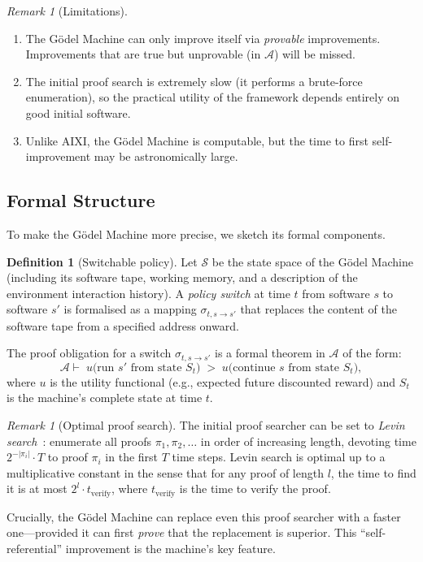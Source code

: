 \documentclass[11pt,a4paper]{article}
\theoremstyle{definition}
\newtheorem{definition}[theorem]{Definition}
\theoremstyle{remark}
\newtheorem{remark}[theorem]{Remark}
\begin{document}
\begin{remark}[Limitations]
\begin{enumerate}[nosep]
\item The G\"odel Machine can only improve itself via \emph{provable}
      improvements.  Improvements that are true but unprovable
      (in $\mathcal{A}$) will be missed.
\item The initial proof search is extremely slow (it performs a brute-force
      enumeration), so the practical utility of the framework depends
      entirely on good initial software.
\item Unlike AIXI, the G\"odel Machine is computable, but the time
      to first self-improvement may be astronomically large.
\end{enumerate}
\end{remark}

\subsection{Formal Structure}

To make the G\"odel Machine more precise, we sketch its formal components.

\begin{definition}[Switchable policy]
Let $\mathcal{S}$ be the state space of the G\"odel Machine (including its
software tape, working memory, and a description of the environment
interaction history).  A \emph{policy switch} at time $t$ from software
$s$ to software $s'$ is formalised as a mapping $\sigma_{t,s\to s'}$ that
replaces the content of the software tape from a specified address onward.
\end{definition}

The proof obligation for a switch $\sigma_{t,s\to s'}$ is a formal theorem
in $\mathcal{A}$ of the form:
\[
  \mathcal{A}\vdash\;
  u\bigl(\text{run } s' \text{ from state } S_t\bigr)
  \;>\;
  u\bigl(\text{continue } s \text{ from state } S_t\bigr),
\]
where $u$ is the utility functional (e.g., expected future discounted reward)
and $S_t$ is the machine's complete state at time $t$.

\begin{remark}[Optimal proof search]
The initial proof searcher can be set to \emph{Levin search}~\cite{Levin1973}:
enumerate all proofs $\pi_1,\pi_2,\ldots$ in order of increasing length,
devoting time $2^{-|\pi_i|}\cdot T$ to proof $\pi_i$ in the first $T$ time
steps.  Levin search is optimal up to a multiplicative constant in the sense
that for any proof of length $l$, the time to find it is at most
$2^l\cdot t_{\mathrm{verify}}$, where $t_{\mathrm{verify}}$ is the time to
verify the proof.

Crucially, the G\"odel Machine can replace even this proof searcher with a
faster one---provided it can first \emph{prove} that the replacement is
superior.  This ``self-referential'' improvement is the machine's key
feature.
\end{remark}
\end{document}
